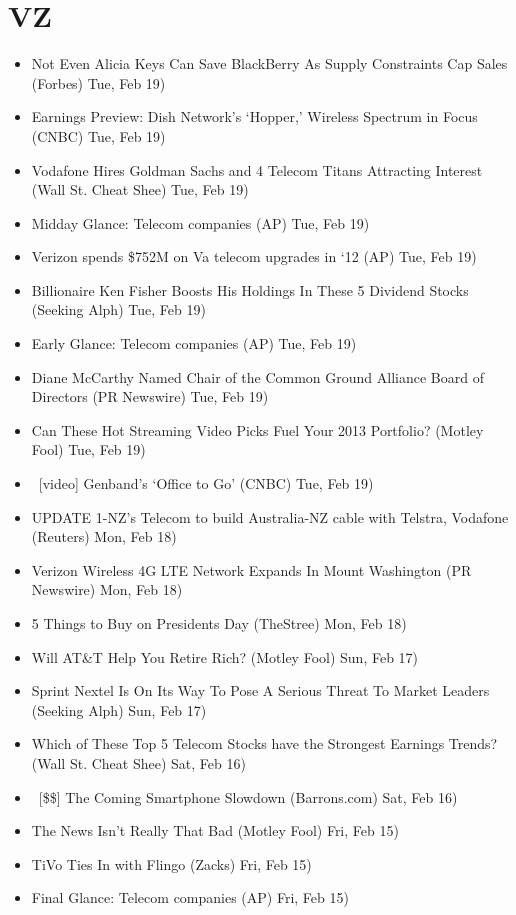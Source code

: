 \documentclass[11pt,asymmetric]{article}
\begin{document}
\section*{VZ}
\begin{itemize}
\item Not Even Alicia Keys Can Save BlackBerry As Supply Constraints Cap Sales (Forbes) Tue, Feb 19)
\item Earnings Preview: Dish Network's `Hopper,' Wireless Spectrum in Focus (CNBC) Tue, Feb 19)
\item Vodafone Hires Goldman Sachs and 4 Telecom Titans Attracting Interest (Wall St. Cheat Shee) Tue, Feb 19)
\item Midday Glance: Telecom companies (AP) Tue, Feb 19)
\item Verizon spends \$752M on Va telecom upgrades in `12 (AP) Tue, Feb 19)
\item Billionaire Ken Fisher Boosts His Holdings In These 5 Dividend Stocks (Seeking Alph) Tue, Feb 19)
\item Early Glance: Telecom companies (AP) Tue, Feb 19)
\item Diane McCarthy Named Chair of the Common Ground Alliance Board of Directors (PR Newswire) Tue, Feb 19)
\item Can These Hot Streaming Video Picks Fuel Your 2013 Portfolio? (Motley Fool) Tue, Feb 19)
\item\ [video] Genband's `Office to Go' (CNBC) Tue, Feb 19)
\item UPDATE 1-NZ's Telecom to build Australia-NZ cable with Telstra, Vodafone (Reuters) Mon, Feb 18)
\item Verizon Wireless 4G LTE Network Expands In Mount Washington (PR Newswire) Mon, Feb 18)
\item 5 Things to Buy on Presidents Day (TheStree) Mon, Feb 18)
\item Will AT\&T Help You Retire Rich? (Motley Fool) Sun, Feb 17)
\item Sprint Nextel Is On Its Way To Pose A Serious Threat To Market Leaders (Seeking Alph) Sun, Feb 17)
\item Which of These Top 5 Telecom Stocks have the Strongest Earnings Trends? (Wall St. Cheat Shee) Sat, Feb 16)
\item\ [\$\$] The Coming Smartphone Slowdown (Barrons.com) Sat, Feb 16)
\item The News Isn't Really That Bad (Motley Fool) Fri, Feb 15)
\item TiVo Ties In with Flingo (Zacks) Fri, Feb 15)
\item Final Glance: Telecom companies (AP) Fri, Feb 15)

\end{itemize}
\end{document}
